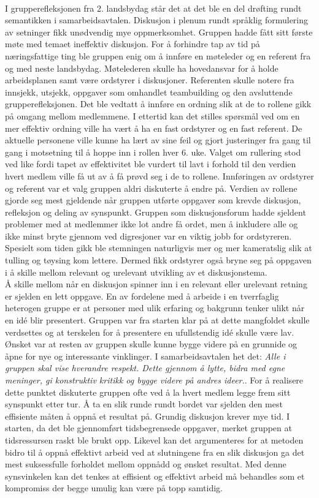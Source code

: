 \\
I grupperefleksjonen fra 2. landsbydag står det at det ble en del drøfting rundt semantikken i samarbeidsavtalen. 
Diskusjon i plenum rundt språklig formulering av setninger fikk unødvendig mye oppmerksomhet.
Gruppen hadde fått sitt første møte med temaet ineffektiv diskusjon.
For å forhindre tap av tid på næringsfattige ting ble gruppen enig om å innføre en møteleder og en referent fra og med neste landsbydag.
Møtelederen skulle ha hovedansvar for å holde arbeidsplanen samt være ordstyrer i diskusjoner.
Referenten skulle notere fra innsjekk, utsjekk, oppgaver som omhandlet teambuilding og den avsluttende grupperefleksjonen.
Det ble vedtatt å innføre en ordning slik at de to rollene gikk på omgang mellom medlemmene.
I ettertid kan det stilles spørsmål ved om en mer effektiv ordning ville ha vært å ha en fast ordstyrer og en fast referent.
De aktuelle personene ville kunne ha lært av sine feil og gjort justeringer fra gang til gang i motsetning til å hoppe inn i rollen hver 6. uke.
Valget om rullering stod ved like fordi tapet av effektivitet ble vurdert til lavt i forhold til den verdien hvert medlem ville få ut av å få prøvd seg i de to rollene.
Innføringen av ordstyrer og referent var et valg gruppen aldri diskuterte å endre på. 
Verdien av rollene gjorde seg mest gjeldende når gruppen utførte oppgaver som krevde diskusjon, refleksjon og deling av synspunkt.
Gruppen som diskusjonsforum hadde sjeldent problemer med at medlemmer ikke lot andre få ordet, men å inkludere alle og ikke minst bryte gjennom ved digresjoner var en viktig jobb for ordstyreren. 
Spesielt som tiden gikk ble stemningen naturligvis mer og mer kameratslig slik at tulling og tøysing kom lettere.
Dermed fikk ordstyrer også bryne seg på oppgaven i å skille mellom relevant og urelevant utvikling av et diskusjonstema.
\\
Å skille mellom når en diskusjon spinner inn i en relevant eller urelevant retning er sjelden en lett oppgave.
En av fordelene med å arbeide i en tverrfaglig heterogen gruppe er at personer med ulik erfaring og bakgrunn tenker ulikt når en id\'{e} blir presentert.
Gruppen var fra starten klar på at dette mangfoldet skulle verdsettes og at terskelen for å presentere en ufullstendig id\'{e} skulle være lav.
Ønsket var at resten av gruppen skulle kunne bygge videre på en grunnide og åpne for nye og interessante vinklinger. 
I samarbeidsavtalen het det: \textit{Alle i gruppen skal vise hverandre respekt. Dette gjennom å lytte, bidra med egne meninger, gi konstruktiv kritikk og bygge videre på andres ideer.}.
For å realisere dette punktet diskuterte gruppen ofte ved å la hvert medlem legge frem sitt synspunkt etter tur.
Å ta en slik runde rundt bordet var sjelden den mest effisiente måten å oppnå et resultat på.
Grundig diskusjon krever mye tid. 
I starten, da det ble gjennomført tidsbegrensede oppgaver, merket gruppen at tidsressursen raskt ble brukt opp.
Likevel kan det argumenteres for at metoden bidro til å oppnå effektivt arbeid ved at slutningene fra en slik diskusjon ga det mest suksessfulle forholdet mellom oppnådd og ønsket resultat.
Med denne synsvinkelen kan det tenkes at effisient og effektivt arbeid må behandles som et kompromiss der begge umulig kan være på topp samtidig.
\\
